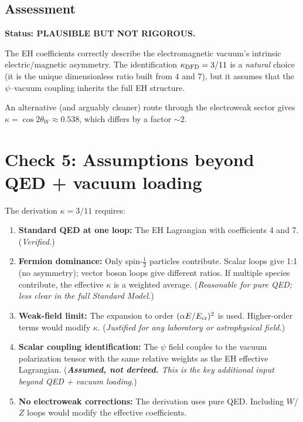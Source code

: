 \documentclass[12pt]{article}
\begin{document}
\subsection{Assessment}

\textbf{Status: PLAUSIBLE BUT NOT RIGOROUS.}

The EH coefficients correctly describe the electromagnetic
vacuum's intrinsic electric/magnetic asymmetry.  The identification
$\kappa_{\rm DFD} = 3/11$ is a \emph{natural} choice (it is the
unique dimensionless ratio built from 4 and 7), but it assumes that
the $\psi$--vacuum coupling inherits the full EH structure.

An alternative (and arguably cleaner) route through the electroweak
sector gives $\kappa = \cos 2\theta_W \approx 0.538$, which differs
by a factor $\sim 2$.

\section{Check 5: Assumptions beyond QED + vacuum loading}

The derivation $\kappa = 3/11$ requires:

\begin{enumerate}
\item \textbf{Standard QED at one loop:} The EH Lagrangian with
  coefficients 4 and 7.  (\emph{Verified.})

\item \textbf{Fermion dominance:} Only spin-$\tfrac{1}{2}$ particles
  contribute.  Scalar loops give 1:1 (no asymmetry); vector boson
  loops give different ratios.  If multiple species contribute, the
  effective $\kappa$ is a weighted average.  (\emph{Reasonable for
  pure QED; less clear in the full Standard Model.})

\item \textbf{Weak-field limit:} The expansion to order $(\alpha
  E/E_{\rm cr})^2$ is used.  Higher-order terms would modify
  $\kappa$.  (\emph{Justified for any laboratory or astrophysical
  field.})

\item \textbf{Scalar coupling identification:} The $\psi$ field
  couples to the vacuum polarization tensor with the same relative
  weights as the EH effective Lagrangian.
  (\emph{\textbf{Assumed, not derived.}  This is the key additional
  input beyond QED + vacuum loading.})

\item \textbf{No electroweak corrections:} The derivation uses pure
  QED.  Including $W$/$Z$ loops would modify the effective
  coefficients.
\end{enumerate}
\end{document}
